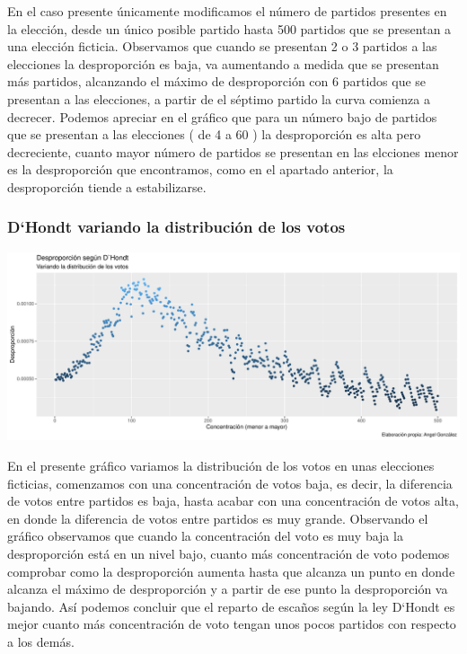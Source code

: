 \documentclass[12pt,a4paper,]{book}
\numberwithin{dummy}{section}
\theoremstyle{ocrenumbox}
\theoremstyle{blacknumex}
\theoremstyle{blacknumbox}
\theoremstyle{ocrenum}
\theoremstyle{ocrenum}
\begin{document}
En el caso presente únicamente modificamos el número de partidos
presentes en la elección, desde un único posible partido hasta 500
partidos que se presentan a una elección ficticia. Observamos que cuando
se presentan 2 o 3 partidos a las elecciones la desproporción es baja,
va aumentando a medida que se presentan más partidos, alcanzando el
máximo de desproporción con 6 partidos que se presentan a las
elecciones, a partir de el séptimo partido la curva comienza a decrecer.
Podemos apreciar en el gráfico que para un número bajo de partidos que
se presentan a las elecciones ( de 4 a 60 ) la desproporción es alta
pero decreciente, cuanto mayor número de partidos se presentan en las
elcciones menor es la desproporción que encontramos, como en el apartado
anterior, la desproporción tiende a estabilizarse.

\hypertarget{dhondt-variando-la-distribuciuxf3n-de-los-votos}{%
\subsubsection{D`Hondt variando la distribución de los
votos}\label{dhondt-variando-la-distribuciuxf3n-de-los-votos}}

\begin{center}\includegraphics[width=0.95\linewidth]{figurasR/unnamed-chunk-11-1} \end{center}

En el presente gráfico variamos la distribución de los votos en unas
elecciones ficticias, comenzamos con una concentración de votos baja, es
decir, la diferencia de votos entre partidos es baja, hasta acabar con
una concentración de votos alta, en donde la diferencia de votos entre
partidos es muy grande. Observando el gráfico observamos que cuando la
concentración del voto es muy baja la desproporción está en un nivel
bajo, cuanto más concentración de voto podemos comprobar como la
desproporción aumenta hasta que alcanza un punto en donde alcanza el
máximo de desproporción y a partir de ese punto la desproporción va
bajando. Así podemos concluir que el reparto de escaños según la ley
D`Hondt es mejor cuanto más concentración de voto tengan unos pocos
partidos con respecto a los demás.
\end{document}
